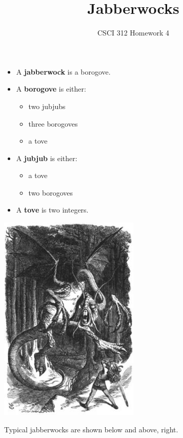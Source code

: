 \documentclass[11pt]{article}
\author{CSCI 312 Homework 4}
\title{Jabberwocks}
\begin{document}
\maketitle

\begin{multicols}{2}
\begin{itemize}
\item A {\bf jabberwock} is a borogove.
\item A {\bf borogove} is either:
  \begin{itemize}
  \item two jubjubs
  \item three borogoves
  \item a tove
  \end{itemize}
\item A {\bf jubjub} is either:
  \begin{itemize}
  \item a tove 
  \item two borogoves
  \end{itemize}
\item A {\bf tove} is two integers.  
\end{itemize}

\newcolumn
\includegraphics[width=0.5\textwidth]{jabberwocky}
\end{multicols}

Typical jabberwocks are shown below and above, right.
\end{document}
